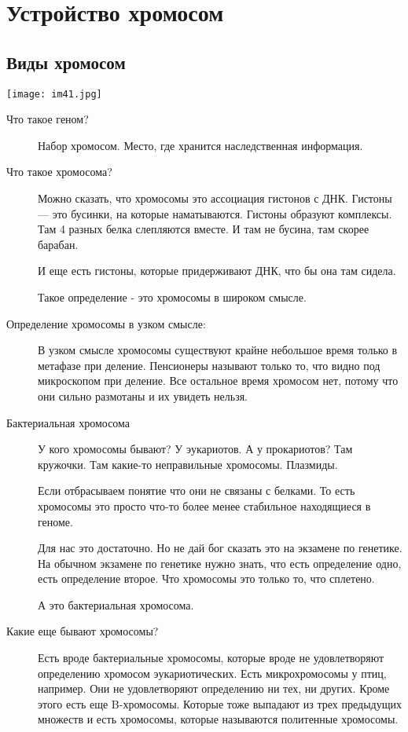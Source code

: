 ﻿\section{Устройство хромосом}

\subsection{Виды хромосом}
\texttt{[image: im41.jpg]}

\begin{description}
\item[Что такое геном?] 
Набор хромосом. Место, где хранится наследственная информация. 
\item[Что такое хромосома?] 
Можно сказать, что хромосомы это ассоциация гистонов с ДНК. 
Гистоны --- это бусинки, на которые наматываются. Гистоны образуют комплексы. 
Там 4 разных белка слепляются вместе. И там не бусина, там скорее барабан. 

И еще есть гистоны, которые придерживают ДНК, что бы она там сидела. 

Такое определение - это хромосомы в широком смысле. 
\item[Определение хромосомы в узком смысле:]
В узком смысле хромосомы существуют крайне небольшое время только 
в метафазе при деление. Пенсионеры называют только то, что 
видно под микроскопом при деление. Все остальное время хромосом нет, 
потому что они сильно размотаны и их увидеть нельзя. 
\item[Бактериальная хромосома] 
У кого хромосомы бывают? 
У эукариотов. А у прокариотов? Там кружочки. Там какие-то 
неправильные хромосомы. Плазмиды. 

Если отбрасываем понятие что они не связаны с белками. То есть
хромосомы это просто что-то более менее стабильное находящиеся в
геноме.

Для нас это достаточно. Но не дай бог сказать это на экзамене по
генетике. На обычном экзамене по генетике нужно знать,
что есть определение одно, есть определение второе. Что
хромосомы это только то, что сплетено.

А это бактериальная хромосома.

\item[Какие еще бывают хромосомы?]
Есть вроде бактериальные хромосомы, которые вроде не удовлетворяют определению 
хромосом эукариотических. Есть микрохромосомы у птиц, 
например. Они не удовлетворяют 
определению ни тех, ни других. Кроме этого есть 
еще B-хромосомы. Которые тоже выпадают из трех предыдущих 
множеств и есть хромосомы, которые называются политенные хромосомы. 


\end{description}
